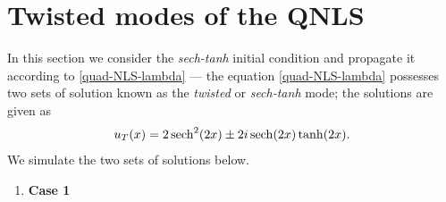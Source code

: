 \documentclass[12pt, letterpaper, twoside]{article}
\begin{document}
\section{Twisted modes of the QNLS}
In this section we consider the \textit{sech-tanh} initial condition and propagate it according to \eqref{quad-NLS-lambda} --- the equation \eqref{quad-NLS-lambda} possesses two sets of solution known as the \textit{twisted} or \textit{sech-tanh} mode; the solutions are given as 
\begin{equation}\label{sech-tanh}
    u_{T}(x) = 2 \sech^2 (2x) \pm 2i \sech (2x) \tanh(2x).
\end{equation}
We simulate the two sets of solutions below.

\begin{enumerate}[label=(\alph*)]
    \item \textbf{Case 1}
    \newline
    

\end{enumerate}
\end{document}
